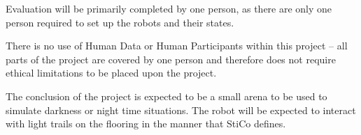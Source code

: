 Evaluation will be primarily completed by one person, as there are only one
person required to set up the robots and their states.  

There is no use of Human Data or Human Participants within this project -- all
parts of the project are covered by one person and therefore does not require
ethical limitations to be placed upon the project.

The conclusion of the project is expected to be a small arena to be used to
simulate darkness or night time situations.  The robot will be expected to
interact with light trails on the flooring in the manner that StiCo defines.
